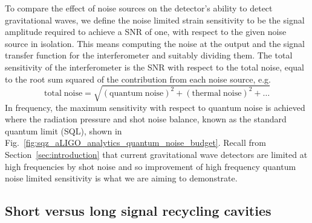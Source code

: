 \documentclass[aps,pra,superscriptaddress,reprint,nofootinbib]{revtex4-1}
\begin{document}
To compare the effect of noise sources on the detector’s ability to detect gravitational waves, we define the noise limited strain sensitivity to be the signal amplitude required to achieve a SNR of one, with respect to the given noise source in isolation. This means computing the noise at the output and the signal transfer function for the interferometer and suitably dividing them. The total sensitivity of the interferometer is the SNR with respect to the total noise, equal to the root sum squared of the contribution from each noise source, e.g.\
\begin{equation}
\mathrm{total\; noise = \sqrt{(quantum \; noise)^2 + (thermal \; noise)^2 + \ldots}}
\end{equation}
In frequency, the maximum sensitivity with respect to quantum noise is achieved where the radiation pressure and shot noise balance, known as the standard quantum limit (SQL), shown in Fig.~\ref{fig:sqz_aLIGO_analytics_quantum_noise_budget}. Recall from Section~\ref{sec:introduction} that current gravitational wave detectors are limited at high frequencies by shot noise and so improvement of high frequency quantum noise limited sensitivity is what we are aiming to demonstrate.


\subsection{Short versus long signal recycling cavities}
\label{sec:long_srcs}
\end{document}
